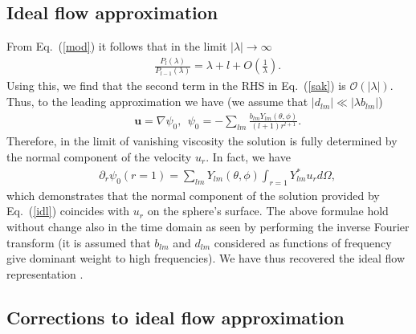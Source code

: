 \documentclass[aps,prx,twocolumn,amsmath,amssymb,amsfonts]{revtex4-2}
\begin{document}
{{\subsection{Ideal flow approximation}

From Eq.~(\ref{mod}) it follows that in the limit $|\lambda|\rightarrow \infty$
\begin{eqnarray}&&
\frac{P_l(\lambda)}{P_{l-1}(\lambda)}=\lambda+l+O\left(\frac{1}{\lambda}\right).
\end{eqnarray}
Using this, we find that the second term in the RHS in Eq.~(\ref{sak}) is $\mathcal{O}(|\lambda|)$.
Thus, to the leading approximation we have (we assume that $|d_{lm}|\ll |\lambda b_{lm}|$)
\begin{eqnarray}&&
\bm u=\nabla \psi_0,\ \ \psi_0=-\sum_{l m}\frac{b_{lm}Y_{lm}(\theta, \phi)}{(l+1)r^{l+1}}. \label{idl}
\end{eqnarray}
Therefore, in the limit of vanishing viscosity the solution is fully determined by the normal component of the velocity $u_r$. In fact, we have
\begin{eqnarray}&&\!\!\!\!\!
\partial_r\psi_0(r=1)=\sum_{l m}Y_{lm}(\theta, \phi)\int_{r=1}Y_{lm}^* u_r d\Omega,
\end{eqnarray}
which demonstrates that the normal component of the solution provided by Eq.~(\ref{idl}) coincides with $u_r$ on the sphere's surface. The above formulae hold without change also in the time domain as seen by performing the inverse Fourier transform (it is assumed that $b_{lm}$ and $d_{lm}$ considered as functions of frequency give dominant weight to high frequencies). We have thus recovered the ideal flow representation \cite{LL}.

\subsection{Corrections to ideal flow approximation}

}}
\end{document}
